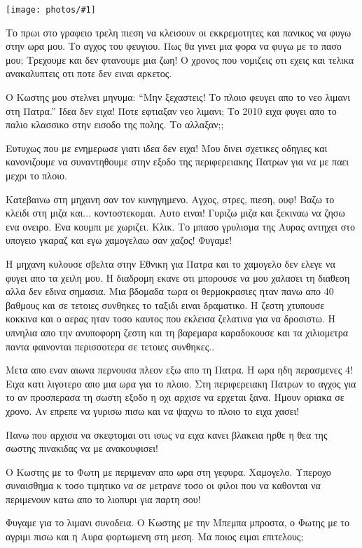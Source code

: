 \documentclass[11pt, letterpaper]{book}
\newcommand\photo[1]{\begin{center}\noindent\texttt{[image: photos/\#1]}\end{center}}
\begin{document}
\photo{2.jpg}

Το πρωι στο γραφειο τρελη πιεση να κλεισουν οι εκκρεμοτητες και πανικος να φυγω στην ωρα μου. 
Το αγχος του φευγιου. Πως θα γινει μια φορα να φυγω με το πασο μου; Τρεχουμε και δεν φτανουμε μια ζωη! 
Ο χρονος που νομιζεις οτι εχεις και τελικα ανακαλυπτεις οτι ποτε δεν ειναι αρκετος.

Ο Κωστης μου στελνει μηνυμα: ``Μην ξεχαστεις! Το πλοιο φευγει απο το νεο λιμανι στη Πατρα.'' Ιδεα δεν ειχα! Ποτε εφτιαξαν νεο λιμανι; Το 2010 ειχα φυγει απο το παλιο κλασσικο στην εισοδο της πολης. Το αλλαξαν;; 

Ευτυχως που με ενημερωσε γιατι ιδεα δεν ειχα! Μου δινει σχετικες οδηγιες και κανονιζουμε να συναντηθουμε στην εξοδο της περιφερειακης Πατρων για να με παει μεχρι το πλοιο. 

Κατεβαινω στη μηχανη σαν τον κυνηγημενο. Αγχος, στρες, πιεση, ουφ! Βαζω το κλειδι στη μιζα και... κοντοστεκομαι. Αυτο ειναι! Γυριζω μιζα και ξεκιναω να ζησω ενα ονειρο. Ενα κουμπι με χωριζει. Κλικ. Το μπασο γρυλισμα της Αυρας αντηχει στο υπογειο γκαραζ και εγω χαμογελαω σαν χαζος! Φυγαμε!

Η μηχανη κυλουσε σβελτα στην Εθνικη για Πατρα και το χαμογελο δεν ελεγε να φυγει απο τα χειλη μου. Η διαδρομη εκανε οτι μπορουσε να μου χαλασει τη διαθεση αλλα δεν εδινα σημασια. Μια βδομαδα τωρα οι θερμοκρασιες ηταν πανω απο 40 βαθμους και σε τετοιες συνθηκες το ταξιδι ειναι δραματικο. Η ζεστη χτυπουσε κοκκινα και ο αερας ηταν τοσο καυτος που εκλεισα ζελατινα για να δροσιστω.  Η υπνηλια απο την ανυποφορη ζεστη και τη βαρεμαρα καραδοκουσε και τα χιλιομετρα παντα φαινονται περισσοτερα σε τετοιες συνθηκες..

Μετα απο εναν αιωνα περνουσα πλεον εξω απο τη Πατρα. Η ωρα ηδη περασμενες 4! Ειχα κατι λιγοτερο απο μια ωρα για το πλοιο.  Στη περιφερειακη Πατρων το αγχος για το αν προσπερασα τη σωστη εξοδο η οχι αρχισε να ερχεται ξανα. Ημουν οριακα σε χρονο. Αν επρεπε να γυρισω πισω και να ψαχνω το πλοιο το ειχα χασει!

Πανω που αρχισα να σκεφτομαι οτι ισως να ειχα κανει βλακεια ηρθε η θεα της σωστης πινακιδας να με ανακουφισει!

Ο Κωστης με το Φωτη με περιμεναν απο ωρα στη γεφυρα. Χαμογελο. Υπεροχο συναισθημα κ τοσο τιμητικο να σε μετρανε τοσο οι φιλοι που να καθονται να περιμενουν κατω απο το λιοπυρι για παρτη σου! 

Φυγαμε για το λιμανι συνοδεια. Ο Κωστης με την Μπεμπα μπροστα, ο Φωτης με το αγριμι πισω και η Αυρα φορτωμενη στη μεση. Μα ποιος ειμαι επιτελους; 
\end{document}

